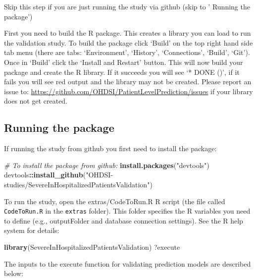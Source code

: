 \documentclass[
]{article}
\newenvironment{Shaded}{\begin{snugshade}}{\end{snugshade}}
\newcommand{\CommentTok}[1]{\textcolor[rgb]{0.56,0.35,0.01}{\textit{#1}}}
\newcommand{\KeywordTok}[1]{\textcolor[rgb]{0.13,0.29,0.53}{\textbf{#1}}}
\newcommand{\NormalTok}[1]{#1}
\newcommand{\OperatorTok}[1]{\textcolor[rgb]{0.81,0.36,0.00}{\textbf{#1}}}
\newcommand{\StringTok}[1]{\textcolor[rgb]{0.31,0.60,0.02}{#1}}
\begin{document}
Skip this step if you are just running the study via github (skip to '
Running the package')

First you need to build the R package. This creates a library you can
load to run the validation study. To build the package click `Build' on
the top right hand side tab menu (there are tabs: `Environment',
`History', `Connections', `Build', `Git'). Once in `Build' click the
`Install and Restart' button. This will now build your package and
create the R library. If it succeeds you will see `* DONE ()', if it
fails you will see red output and the library may not be created. Please
report an issue to:
\url{https://github.com/OHDSI/PatientLevelPrediction/issues} if your
library does not get created.

\hypertarget{running-the-package}{%
\subsection{Running the package}\label{running-the-package}}

If running the study from github you first need to install the package:

\begin{Shaded}
\begin{Highlighting}[]
\CommentTok{# To install the package from github:}
\KeywordTok{install.packages}\NormalTok{(}\StringTok{"devtools"}\NormalTok{)}
\NormalTok{devtools}\OperatorTok{::}\KeywordTok{install_github}\NormalTok{(}\StringTok{"OHDSI-studies/SevereInHospitalizedPatientsValidation"}\NormalTok{)}
\end{Highlighting}
\end{Shaded}

To run the study, open the extras/CodeToRun.R R script (the file called
\texttt{CodeToRun.R} in the \texttt{extras} folder). This folder
specifies the R variables you need to define (e.g., outputFolder and
database connection settings). See the R help system for details:

\begin{Shaded}
\begin{Highlighting}[]
\KeywordTok{library}\NormalTok{(SevereInHospitalizedPatientsValidation)}
\NormalTok{?execute}
\end{Highlighting}
\end{Shaded}

The inputs to the execute function for validating prediction models are
described below:
\end{document}
